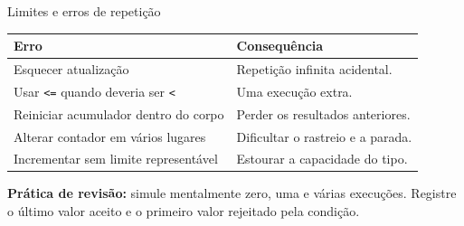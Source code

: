 \begin{frame}{Limites e erros de repetição}
\begin{tabularx}{\textwidth}{XX}
\toprule
Erro & Consequência \\
\midrule
Esquecer atualização & Repetição infinita acidental. \\
Usar \texttt{<=} quando deveria ser \texttt{<} & Uma execução extra. \\
Reiniciar acumulador dentro do corpo & Perder os resultados anteriores. \\
Alterar contador em vários lugares & Dificultar o rastreio e a parada. \\
Incrementar sem limite representável & Estourar a capacidade do tipo. \\
\bottomrule
\end{tabularx}
\vspace{0.35cm}
\textbf{Prática de revisão:} simule mentalmente zero, uma e várias execuções. Registre o último valor aceito e o primeiro valor rejeitado pela condição.
\end{frame}
